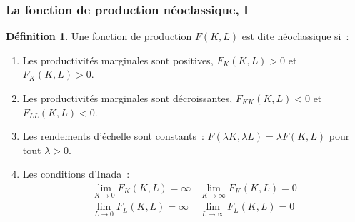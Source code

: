 \documentclass[10pt,notheorems]{beamer}
\theoremstyle{plain}
\theoremstyle{definition} %
\newtheorem{definition}{Définition}
\begin{document}
\begin{frame}
  \frametitle{La fonction de production néoclassique, I}


  \begin{definition}
    Une fonction de production $F(K,L)$ est dite néoclassique si~:
    \medskip
    \begin{enumerate}

    \item Les productivités marginales sont positives, $F_K(K,L)>0$ et $F_K(K,L)>0$.\newline

    \item Les productivités marginales sont décroissantes, $F_{KK}(K,L)<0$ et $F_{LL}(K,L)<0$.\newline

    \item Les rendements d'échelle sont constants~: $F(\lambda K, \lambda L) = \lambda F(K,L)$ pour tout $\lambda>0$.\newline

    \item Les conditions d'Inada~:
      \[
        \begin{split}
          \lim_{K\rightarrow 0}F_K(K,L) = \infty & \lim_{K\rightarrow \infty}F_K(K,L) = 0 \\
          \lim_{L\rightarrow 0}F_L(K,L) = \infty & \lim_{L\rightarrow \infty}F_L(K,L) = 0
        \end{split}
      \]

    \end{enumerate}
  \end{definition}

\end{frame}
\end{document}

